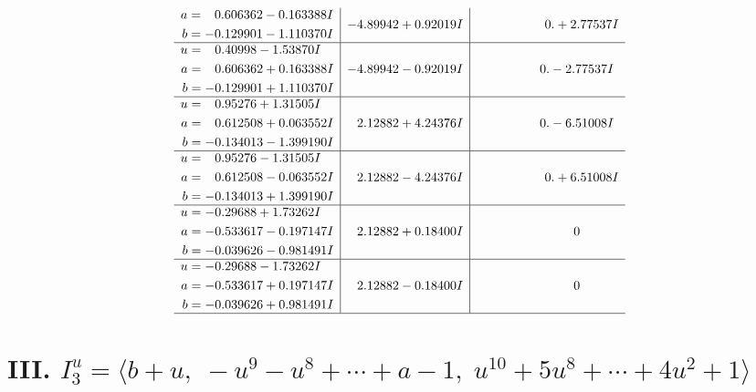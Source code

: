 \documentclass[1p]{elsarticle_modified}
\theoremstyle{definition}
\begin{document}
$$\begin{array}{c|c|c}
\begin{aligned}
a &= \phantom{-}0.606362 - 0.163388 I \\
b &= -0.129901 - 1.110370 I\end{aligned}
 & -4.89942 + 0.92019 I & \phantom{-0.000000 -}0. + 2.77537 I \\ \hline\begin{aligned}
u &= \phantom{-}0.40998 - 1.53870 I \\
a &= \phantom{-}0.606362 + 0.163388 I \\
b &= -0.129901 + 1.110370 I\end{aligned}
 & -4.89942 - 0.92019 I & \phantom{-0.000000 } 0. - 2.77537 I \\ \hline\begin{aligned}
u &= \phantom{-}0.95276 + 1.31505 I \\
a &= \phantom{-}0.612508 + 0.063552 I \\
b &= -0.134013 - 1.399190 I\end{aligned}
 & \phantom{-}2.12882 + 4.24376 I & \phantom{-0.000000 } 0. - 6.51008 I \\ \hline\begin{aligned}
u &= \phantom{-}0.95276 - 1.31505 I \\
a &= \phantom{-}0.612508 - 0.063552 I \\
b &= -0.134013 + 1.399190 I\end{aligned}
 & \phantom{-}2.12882 - 4.24376 I & \phantom{-0.000000 -}0. + 6.51008 I \\ \hline\begin{aligned}
u &= -0.29688 + 1.73262 I \\
a &= -0.533617 - 0.197147 I \\
b &= -0.039626 - 0.981491 I\end{aligned}
 & \phantom{-}2.12882 + 0.18400 I & \phantom{-0.000000 } 0 \\ \hline\begin{aligned}
u &= -0.29688 - 1.73262 I \\
a &= -0.533617 + 0.197147 I \\
b &= -0.039626 + 0.981491 I\end{aligned}
 & \phantom{-}2.12882 - 0.18400 I & \phantom{-0.000000 } 0\\
 \hline 
 \end{array}$$\newpage\newpage\renewcommand{\arraystretch}{1}
\centering \section*{III. $I^u_{3}= \langle b+u,\;- u^9- u^8+\cdots+a-1,\;u^{10}+5 u^8+\cdots+4 u^2+1 \rangle$}
\end{document}
